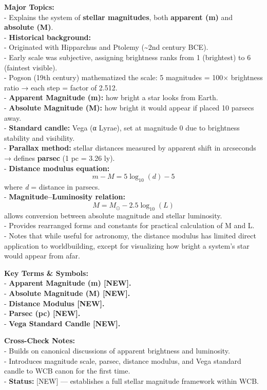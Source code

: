\documentclass[
  letterpaper,
]{book}
\begin{document}
\textbf{Major Topics:}\\
- Explains the system of \textbf{stellar magnitudes}, both
\textbf{apparent (m)} and \textbf{absolute (M)}.\\
- \textbf{Historical background:}\\
- Originated with Hipparchus and Ptolemy (\textasciitilde2nd century
BCE).\\
- Early scale was subjective, assigning brightness ranks from 1
(brightest) to 6 (faintest visible).\\
- Pogson (19th century) mathematized the scale: 5 magnitudes = 100×
brightness ratio → each step = factor of 2.512.\\
- \textbf{Apparent Magnitude (m):} how bright a star looks from Earth.\\
- \textbf{Absolute Magnitude (M):} how bright it would appear if placed
10 parsecs away.\\
- \textbf{Standard candle:} Vega (α Lyrae), set at magnitude 0 due to
brightness stability and visibility.\\
- \textbf{Parallax method:} stellar distances measured by apparent shift
in arcseconds → defines \textbf{parsec} (1 pc = 3.26 ly).\\
- \textbf{Distance modulus equation:}\\
\[
  m - M = 5 \log_{10}(d) - 5
  \] where \emph{d} = distance in parsecs.\\
- \textbf{Magnitude--Luminosity relation:}\\
\[
  M = M_⊙ - 2.5\log_{10}(L)
  \] allows conversion between absolute magnitude and stellar
luminosity.\\
- Provides rearranged forms and constants for practical calculation of M
and L.\\
- Notes that while useful for astronomy, the distance modulus has
limited direct application to worldbuilding, except for visualizing how
bright a system's star would appear from afar.

\textbf{Key Terms \& Symbols:}\\
- \textbf{Apparent Magnitude (m) {[}NEW{]}.}\\
- \textbf{Absolute Magnitude (M) {[}NEW{]}.}\\
- \textbf{Distance Modulus {[}NEW{]}.}\\
- \textbf{Parsec (pc) {[}NEW{]}.}\\
- \textbf{Vega Standard Candle {[}NEW{]}.}

\textbf{Cross-Check Notes:}\\
- Builds on canonical discussions of apparent brightness and
luminosity.\\
- Introduces magnitude scale, parsec, distance modulus, and Vega
standard candle to WCB canon for the first time.\\
- \textbf{Status:} {[}NEW{]} --- establishes a full stellar magnitude
framework within WCB.
\end{document}
